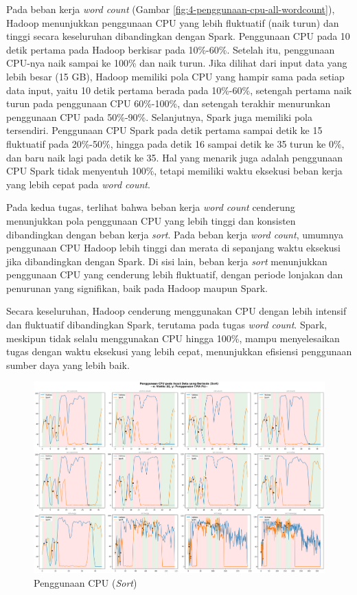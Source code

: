 Pada beban kerja \textit{word count} (Gambar \ref{fig:4-penggunaan-cpu-all-wordcount}), Hadoop menunjukkan penggunaan CPU yang lebih fluktuatif (naik turun) dan tinggi secara keseluruhan dibandingkan dengan Spark. Penggunaan CPU pada 10 detik pertama pada Hadoop berkisar pada 10\%-60\%. Setelah itu, penggunaan CPU-nya naik sampai ke 100\% dan naik turun. Jika dilihat dari input data yang lebih besar (15 GB), Hadoop memiliki pola CPU yang hampir sama pada setiap data input, yaitu 10 detik pertama berada pada 10\%-60\%, setengah pertama naik turun pada penggunaan CPU 60\%-100\%, dan setengah terakhir menurunkan penggunaan CPU pada 50\%-90\%. Selanjutnya, Spark juga memiliki pola tersendiri. Penggunaan CPU Spark pada detik pertama sampai detik ke 15 fluktuatif pada 20\%-50\%, hingga pada detik 16 sampai detik ke 35 turun ke 0\%, dan baru naik lagi pada detik ke 35. Hal yang menarik juga adalah penggunaan CPU Spark tidak menyentuh 100\%, tetapi memiliki waktu eksekusi beban kerja yang lebih cepat pada \textit{word count}.

Pada kedua tugas, terlihat bahwa beban kerja \textit{word count} cenderung menunjukkan pola penggunaan CPU yang lebih tinggi dan konsisten dibandingkan dengan beban kerja \textit{sort}. Pada beban kerja \textit{word count}, umumnya penggunaan CPU Hadoop lebih tinggi dan merata di sepanjang waktu eksekusi jika dibandingkan dengan Spark. Di sisi lain, beban kerja \textit{sort} menunjukkan penggunaan CPU yang cenderung lebih fluktuatif, dengan periode lonjakan dan penurunan yang signifikan, baik pada Hadoop maupun Spark.

Secara keseluruhan, Hadoop cenderung menggunakan CPU dengan lebih intensif dan fluktuatif dibandingkan Spark, terutama pada tugas \textit{word count}. Spark, meskipun tidak selalu menggunakan CPU hingga 100\%, mampu menyelesaikan tugas dengan waktu eksekusi yang lebih cepat, menunjukkan efisiensi penggunaan sumber daya yang lebih baik.

\begin{landscape}
\begin{figure}[h]
    \centering
    \includegraphics[height=0.6\linewidth]{figures/ch04/4-penggunaan-cpu-all-sort.png}
    \caption{Penggunaan CPU (\textit{Sort})}
    \label{fig:4-penggunaan-cpu-all-sort}
\end{figure}
\end{landscape}

